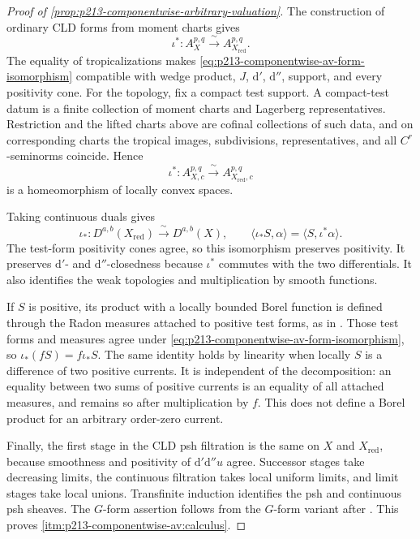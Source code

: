 \begin{proof}[Proof of
\cref{prop:p213-componentwise-arbitrary-valuation}]
The construction of ordinary CLD forms from moment charts gives
\begin{equation}
 \label{eq:p213-componentwise-av-form-isomorphism}
 \iota^*:A_X^{p,q}\xrightarrow{\ \sim\ }
                    A_{X_{\mathrm{red}}}^{p,q}.
\end{equation}
The equality of tropicalizations makes
\eqref{eq:p213-componentwise-av-form-isomorphism} compatible with wedge
product, $J$, $\mathrm d'$, $\mathrm d''$, support, and every positivity
cone.  For the topology, fix a compact test support.  A compact-test datum
is a finite collection of moment charts and Lagerberg representatives.
Restriction and the lifted charts above are cofinal collections of such
data, and on corresponding charts the tropical images, subdivisions,
representatives, and all $C^r$-seminorms coincide.  Hence
\begin{equation}
 \label{eq:p213-componentwise-av-test-homeomorphism}
 \iota^*:A^{p,q}_{X,c}\xrightarrow{\ \sim\ }
                    A^{p,q}_{X_{\mathrm{red}},c}
\end{equation}
is a homeomorphism of locally convex spaces.

Taking continuous duals gives
\begin{equation}
 \label{eq:p213-componentwise-av-current-isomorphism}
 \iota_*:D^{a,b}(X_{\mathrm{red}})
       \xrightarrow{\ \sim\ }D^{a,b}(X),
 \qquad
 \langle\iota_*S,\alpha\rangle
       =\langle S,\iota^*\alpha\rangle.
\end{equation}
The test-form positivity cones agree, so this isomorphism preserves
positivity.  It preserves $\mathrm d'$- and $\mathrm d''$-closedness because
$\iota^*$ commutes with the two differentials.  It also identifies the weak
topologies and multiplication by smooth functions.

If $S$ is positive, its product with a locally bounded Borel function is
defined through the Radon measures attached to positive test forms, as in
\cite[Example~7.2.12]{CLD25}.  Those test forms and measures agree under
\eqref{eq:p213-componentwise-av-form-isomorphism}, so
$\iota_*(fS)=f\iota_*S$.  The same identity holds by linearity when locally
$S$ is a difference of two positive currents.  It is independent of the
decomposition: an equality between two sums of positive currents is an
equality of all attached measures, and remains so after multiplication by
$f$.  This does not define a Borel product for an arbitrary order-zero
current.

Finally, the first stage in the CLD psh filtration is the same on $X$ and
$X_{\mathrm{red}}$, because smoothness and positivity of
$\mathrm d'\mathrm d''u$ agree.  Successor stages take decreasing limits,
the continuous filtration takes local uniform limits, and limit stages
take local unions.  Transfinite induction identifies the psh and continuous
psh sheaves.  The $G$-form assertion follows from the $G$-form variant after
\cite[Proposition~15.1.3]{CLD25}.  This proves
\cref{itm:p213-componentwise-av:calculus}.


\end{proof}
